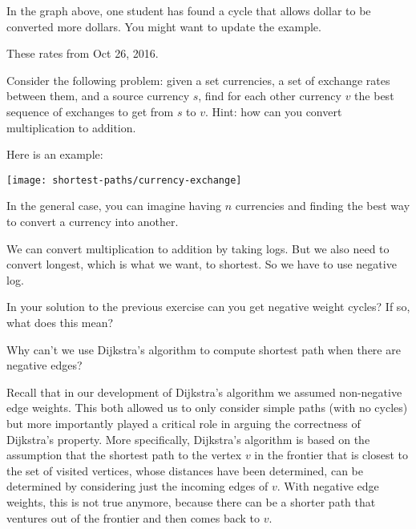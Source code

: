 \begin{notesonly}
\begin{todo}
 In the graph above, one student has found a cycle that allows
dollar to be converted more dollars.  You might want to update the example. 

These rates from Oct 26, 2016.

\end{todo}

\begin{exercise}
  Consider the following  problem: given a set
  currencies, a set of exchange rates between them, and a source
  currency $s$, find for each other currency $v$ the best sequence of
  exchanges to get from $s$ to $v$.  Hint: how can you convert
  multiplication to addition.

Here is an example:

\texttt{[image: shortest-paths/currency-exchange]}

In the general case, you can imagine having $n$ currencies and finding
the best way to convert a currency into another.


\end{exercise}




We can convert multiplication to addition by taking logs.  But we also
need to convert longest, which is what we want, to shortest.  So we
have to use negative log. 


\begin{exercise}
In your solution to the previous exercise can you get negative weight
cycles?   If so, what does this mean?
\end{exercise}

\end{notesonly}

\begin{question}
Why can't we use Dijkstra's algorithm to compute shortest path when
there are negative edges?
\end{question}

Recall that in our development of Dijkstra's algorithm we assumed
non-negative edge weights.  This both allowed us to only consider
simple paths (with no cycles) but more importantly played a critical
role in arguing the correctness of Dijkstra's property.  More
specifically, Dijkstra's algorithm is based on the assumption that the
shortest path to the vertex $v$ in the frontier that is closest to the
set of visited vertices, whose distances have been determined, can be
determined by considering just the incoming edges of $v$.  With
negative edge weights, this is not true anymore, because there can be a
shorter path that ventures out of the frontier and then comes back to
$v$.


